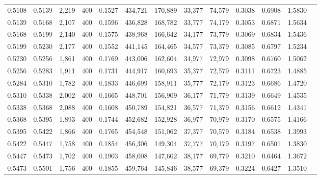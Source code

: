 \begin{tabular}{rrrrrrrrrrrrr}
0.5108 & 0.5139 &  2,219 &   400 &                                     0.1527 & 434,721 & 170,889 &  33,377 &  74,579 & 0.3038 & 0.6908 & 1.5830 \\
0.5139 & 0.5168 &  2,107 &   400 &                                     0.1596 & 436,828 & 168,782 &  33,777 &  74,179 & 0.3053 & 0.6871 & 1.5634 \\
0.5168 & 0.5199 &  2,140 &   400 &                                     0.1575 & 438,968 & 166,642 &  34,177 &  73,779 & 0.3069 & 0.6834 & 1.5436 \\
0.5199 & 0.5230 &  2,177 &   400 &                                     0.1552 & 441,145 & 164,465 &  34,577 &  73,379 & 0.3085 & 0.6797 & 1.5234 \\
0.5230 & 0.5256 &  1,861 &   400 &                                     0.1769 & 443,006 & 162,604 &  34,977 &  72,979 & 0.3098 & 0.6760 & 1.5062 \\
0.5256 & 0.5283 &  1,911 &   400 &                                     0.1731 & 444,917 & 160,693 &  35,377 &  72,579 & 0.3111 & 0.6723 & 1.4885 \\
0.5284 & 0.5310 &  1,782 &   400 &                                     0.1833 & 446,699 & 158,911 &  35,777 &  72,179 & 0.3123 & 0.6686 & 1.4720 \\
0.5310 & 0.5338 &  2,002 &   400 &                                     0.1665 & 448,701 & 156,909 &  36,177 &  71,779 & 0.3139 & 0.6649 & 1.4535 \\
0.5338 & 0.5368 &  2,088 &   400 &                                     0.1608 & 450,789 & 154,821 &  36,577 &  71,379 & 0.3156 & 0.6612 & 1.4341 \\
0.5368 & 0.5395 &  1,893 &   400 &                                     0.1744 & 452,682 & 152,928 &  36,977 &  70,979 & 0.3170 & 0.6575 & 1.4166 \\
0.5395 & 0.5422 &  1,866 &   400 &                                     0.1765 & 454,548 & 151,062 &  37,377 &  70,579 & 0.3184 & 0.6538 & 1.3993 \\
0.5422 & 0.5447 &  1,758 &   400 &                                     0.1854 & 456,306 & 149,304 &  37,777 &  70,179 & 0.3197 & 0.6501 & 1.3830 \\
0.5447 & 0.5473 &  1,702 &   400 &                                     0.1903 & 458,008 & 147,602 &  38,177 &  69,779 & 0.3210 & 0.6464 & 1.3672 \\
0.5473 & 0.5501 &  1,756 &   400 &                                     0.1855 & 459,764 & 145,846 &  38,577 &  69,379 & 0.3224 & 0.6427 & 1.3510 \\

\end{tabular}
